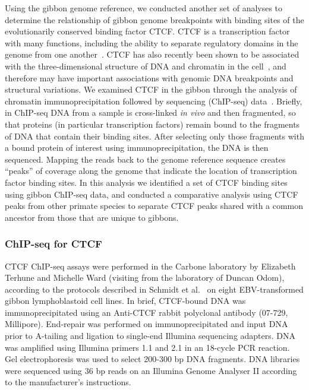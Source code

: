 Using the gibbon genome reference, we conducted another set of analyses to determine the relationship of gibbon genome breakpoints with binding sites of the evolutionarily conserved binding factor CTCF. CTCF is a transcription factor with many functions, including the ability to separate regulatory domains in the genome from one another~\cite{Phillips:2009fr}. CTCF has also recently been shown to be associated with the three-dimensional structure of DNA and chromatin in the cell~\cite{Dixon:2012gc}, and therefore may have important associations with genomic DNA breakpoints and structural variations. We examined CTCF in the gibbon through the analysis of chromatin immunoprecipitation followed by sequencing (ChIP-seq) data~\cite{Park:2009gl}. Briefly, in ChIP-seq DNA from a sample is cross-linked \emph{in vivo} and then fragmented, so that proteins (in particular transcription factors) remain bound to the fragments of DNA that contain their binding sites. After selecting only those fragments with a bound protein of interest using immunoprecipitation, the DNA is then sequenced. Mapping the reads back to the genome reference sequence creates ``peaks'' of coverage along the genome that indicate the location of transcription factor binding sites. In this analysis we identified a set of CTCF binding sites using gibbon ChIP-seq data, and conducted a comparative analysis using CTCF peaks from other primate species to separate CTCF peaks shared with a common ancestor from those that are unique to gibbons.

\subsubsection{ChIP-seq for CTCF}

CTCF ChIP-seq assays were performed in the Carbone laboratory by Elizabeth Terhune and Michelle Ward (visiting from the laboratory of Duncan Odom), according to the protocols described in Schmidt et al.~\cite{Schmidt:2012dt} on eight EBV-transformed gibbon lymphoblastoid cell lines. In brief, CTCF-bound DNA was immunoprecipitated using an Anti-CTCF rabbit polyclonal antibody (07-729, Millipore). End-repair was performed on immunoprecipitated and input DNA prior to A-tailing and ligation to single-end Illumina sequencing adapters. DNA was amplified using Illumina primers 1.1 and 2.1 in an 18-cycle PCR reaction. Gel electrophoresis was used to select 200-300 bp DNA fragments. DNA libraries were sequenced using 36 bp reads on an Illumina Genome Analyser II according to the manufacturer's instructions.

